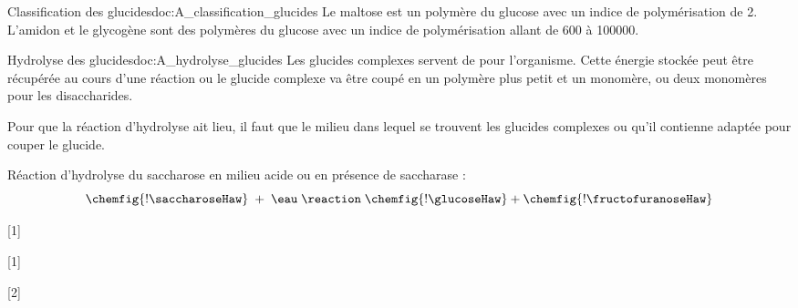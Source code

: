 \begin{doc}{Classification des glucides}{doc:A_classification_glucides}
  Le maltose est un polymère du glucose avec un indice de polymérisation de \num{2}.
  L'amidon et le glycogène sont des polymères du glucose avec un indice de polymérisation allant de \num{600} à \num{100000}.
\end{doc}

\begin{doc}{Hydrolyse des glucides}{doc:A_hydrolyse_glucides}
  Les glucides complexes servent de  pour l'organisme. 
  Cette énergie stockée peut être récupérée au cours d'une réaction  ou le glucide complexe va être coupé en un polymère plus petit et un monomère, ou deux monomères pour les disaccharides.

  \begin{importants}
    Pour que la réaction d'hydrolyse ait lieu, il faut que le milieu dans lequel se trouvent les glucides complexes  ou qu'il contienne  adaptée pour couper le glucide.
  \end{importants}

  \exemple Réaction d'hydrolyse du saccharose en milieu acide ou en présence de saccharase :
  \begin{equation*}
    \chemfig{!\saccharoseHaw} \; + \; \eau \; \reaction \; \chemfig{!\glucoseHaw} + \chemfig{!\fructofuranoseHaw}
  \end{equation*}
\end{doc}

[1]

[1]

[2]

